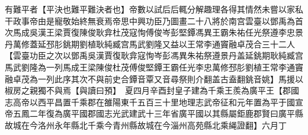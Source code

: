 有難平者【平決也難平難決者也】帝數以試后后輒分解趣理各得其情然未嘗以家私干政事帝由是寵敬始終無衰焉帝思中興功臣乃圖畫二十八將於南宫雲臺以鄧禹為首次馬成吳漢王梁賈復陳俊耿弇杜茂寇恂傅俊岑彭堅鐔馮異王霸朱祐任光祭遵李忠景丹萬修蓋延邳肜銚期劉植耿純臧宫馬武劉隆又益以王常李通竇融卓茂合三十二人【雲臺功臣之次以鄧禹吳漢賈復耿弇寇恂岑彭馮異朱祐祭遵景丹盖延銚期耿純臧宫馬武劉隆為一列馬成王梁陳俊杜茂傅俊堅鐔王霸任光李忠萬修邳肜劉植王常李通竇融卓茂為一列此序其次不與前史合鐔音覃又音尋祭則介翻盖古盍翻銚音姚】馬援以椒房之親獨不與焉【與讀曰預】　夏四月辛酉封皇子建為千乘王羨為廣平王【郡國志高帝以西平昌置千乘郡在雒陽東千五百三十里地理志武帝征和元年置為平于國宣帝五鳳二年復為廣平國郡國志光武建武十三年省廣平國以其縣屬鉅鹿郡賢曰廣平縣故城在今洛州永年縣北千乘今青州縣故城在今淄州高苑縣北乘䋲證翻】六月丁